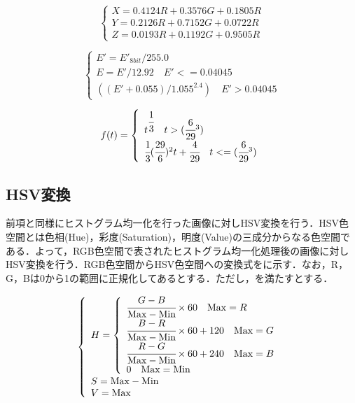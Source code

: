 \documentclass[../Thesis]{subfiles}
\begin{document}
  \begin{equation}
    \left\{
      \begin{array}{l}
        X = 0.4124R+0.3576G+0.1805R \\
        Y = 0.2126R+0.7152G+0.0722R \\
        Z = 0.0193R+0.1192G+0.9505R
      \end{array}
    \right.
  \label{form05}
  \end{equation}

  \begin{equation}
    \left\{
      \begin{array}{l}
        E' = E'_{8bit} / 255.0 \\
        E = E'/12.92 \quad E'<=0.04045 \\
        ((E'+0.055)/1.055^2.4) \quad E'>0.04045
      \end{array}
    \right.
  \label{form06}
  \end{equation}
  
  \begin{equation}
  f(t) = 
    \left\{
      \begin{array}{l}
        t^{\cfrac{1}{3}} \quad t>(\cfrac{6}{29}^3) \\
        \cfrac{1}{3}(\cfrac{29}{6})^2t+\cfrac{4}{29} \quad t<=(\cfrac{6}{29}^3)
      \end{array}
    \right.
  \label{form07}
  \end{equation}


\subsection{HSV変換}
  前項と同様にヒストグラム均一化を行った画像に対しHSV変換\cite{art06}を行う．HSV色空間とは色相(Hue)，彩度(Saturation)，明度(Value)の三成分からなる色空間である．よって，RGB色空間で表されたヒストグラム均一化処理後の画像に対しHSV変換を行う．RGB色空間からHSV色空間への変換式をに示す．なお，R，G，Bは0から1の範囲に正規化してあるとする．ただし，を満たすとする．

  \begin{equation}
    \left\{
      \begin{array}{l}
        H = 
        \left\{
          \begin{array}{l}
            \cfrac{G-B}{{\rm Max}-{\rm Min}} \times 60 \quad {\rm Max} = R \\
            \cfrac{B-R}{{\rm Max}-{\rm Min}} \times 60 + 120 \quad {\rm Max} = G \\
            \cfrac{R-G}{{\rm Max}-{\rm Min}} \times 60 + 240 \quad {\rm Max} = B \\
            0 \quad {\rm Max} = {\rm Min} \\
          \end{array}
        \right.
        \\ S = {\rm Max} - {\rm Min} \\
        V = {\rm Max}
      \end{array}
    \right.
  \label{form08}
  \end{equation}
  
\end{document}
